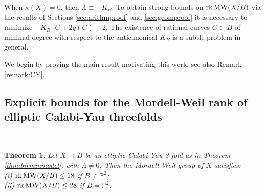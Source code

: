 \documentclass[11pt]{amsart}
\newtheorem{theorem}{Theorem}[section]
\theoremstyle{definition}
\theoremstyle{definition}
\theoremstyle{remark}
\theoremstyle{remark}
\theoremstyle{definition}
\theoremstyle{conjecture}
\newcommand{\MW}{\mathrm{MW}}
\begin{document}
When $\kappa (X)=0$, then  $ \Lambda \equiv -K_B$. To obtain strong bounds on ${\rm rk}\,  \MW(X/B)$  via the results of  Sections  \ref{sec:arithmproof} and \ref{sec:geomproof}  it is necessary to minimize  $-K_B \cdot C + 2g(C)-2$.  The existence of rational curves  $C \subset B$ of minimal degree with respect to the anticanonical $K_B$ is a subtle problem in general.
 
We begin by  proving the main result motivating this work, see also  Remark \ref{remark:CY}.







\subsection{Explicit bounds for the Mordell-Weil rank of elliptic Calabi-Yau 
threefolds}\label{subsec:CY3}~

\medskip


 \begin{theorem} \label{boundCY3} Let  $X \to B$  be an elliptic Calabi-Yau 3-fold  
as in Theorem \ref{thm:birminmodel}, with $\Lambda \neq 0$. 
 Then the Mordell-Weil group of $X$ satisfies:\\
(i) ${\rm rk}\, \MW(X/B)\leq 18$ if $B \neq {\mathbb P}^2$;\\
(ii) ${\rm rk}\, \MW(X/B)\leq 28$ if $B  = {\mathbb P}^2$.
 
 
    
 \end{theorem}
\end{document}
